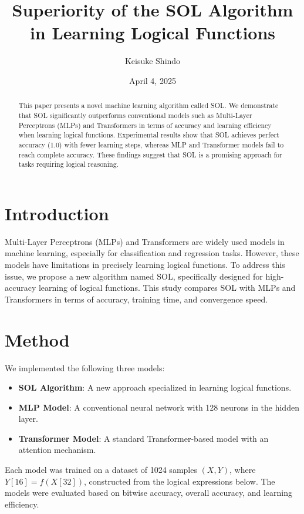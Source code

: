 \documentclass[11pt]{article}
\title{\bf Superiority of the SOL Algorithm in Learning Logical Functions}
\author{Keisuke Shindo}
\date{April 4, 2025}
\begin{document}
\maketitle

\begin{abstract}
This paper presents a novel machine learning algorithm called SOL. We demonstrate that SOL significantly outperforms conventional models such as Multi-Layer Perceptrons (MLPs) and Transformers in terms of accuracy and learning efficiency when learning logical functions. Experimental results show that SOL achieves perfect accuracy (1.0) with fewer learning steps, whereas MLP and Transformer models fail to reach complete accuracy. These findings suggest that SOL is a promising approach for tasks requiring logical reasoning.
\end{abstract}

\section{Introduction}
Multi-Layer Perceptrons (MLPs) and Transformers are widely used models in machine learning, especially for classification and regression tasks. However, these models have limitations in precisely learning logical functions. To address this issue, we propose a new algorithm named SOL, specifically designed for high-accuracy learning of logical functions. This study compares SOL with MLPs and Transformers in terms of accuracy, training time, and convergence speed.

\section{Method}
We implemented the following three models:

\begin{itemize}
    \item \textbf{SOL Algorithm}: A new approach specialized in learning logical functions.
    \item \textbf{MLP Model}: A conventional neural network with 128 neurons in the hidden layer.
    \item \textbf{Transformer Model}: A standard Transformer-based model with an attention mechanism.
\end{itemize}

Each model was trained on a dataset of 1024 samples $(X, Y)$, where $Y[16] = f(X[32])$, constructed from the logical expressions below. The models were evaluated based on bitwise accuracy, overall accuracy, and learning efficiency.
\end{document}
